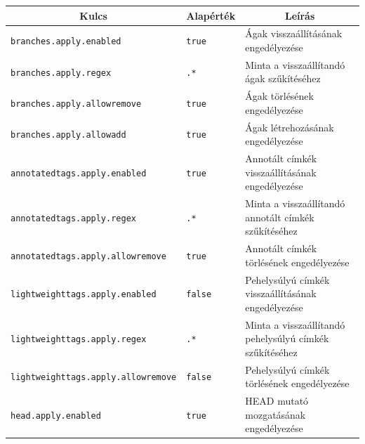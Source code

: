 \documentclass[
]{elteikthesis}[2025/03/25]
\begin{document}
\begin{table}[p]
\captionsetup{justification=justified, singlelinecheck=false}
\begin{center}
\begin{tabular}{|l|l|p{4.5cm}|} 
 \hline
 \multicolumn{1}{|c}{\textbf{Kulcs}} &
 \multicolumn{1}{|c}{\textbf{Alapérték}} &
 \multicolumn{1}{|c|}{\textbf{Leírás}} \\
 \hline\hline
 
 \texttt{branches.apply.enabled} & \texttt{true} & Ágak visszaállításának engedélyezése\vspace{0.5em} \\
 \texttt{branches.apply.regex} & \texttt{.*} & Minta a visszaállítandó ágak szűkítéséhez\vspace{0.5em} \\
 \texttt{branches.apply.allowremove} & \texttt{true} & Ágak törlésének engedélyezése\vspace{0.5em} \\
 \texttt{branches.apply.allowadd} & \texttt{true} & Ágak létrehozásának engedélyezése\vspace{0.5em} \\
 \texttt{annotatedtags.apply.enabled} & \texttt{true} & Annotált címkék visszaállításának engedélyezése\vspace{0.5em} \\
 \texttt{annotatedtags.apply.regex} & \texttt{.*} & Minta a visszaállítandó annotált címkék szűkítéséhez\vspace{0.5em} \\
 \texttt{annotatedtags.apply.allowremove} & \texttt{true} & Annotált címkék törlésének engedélyezése\vspace{0.5em} \\
 \texttt{lightweighttags.apply.enabled} & \texttt{false} & Pehelysúlyú címkék visszaállításának engedélyezése\vspace{0.5em} \\
 \texttt{lightweighttags.apply.regex} & \texttt{.*} & Minta a visszaállítandó pehelysúlyú címkék szűkítéséhez\vspace{0.5em} \\
 \texttt{lightweighttags.apply.allowremove} & \texttt{false} & Pehelysúlyú címkék törlésének engedélyezése\vspace{0.5em} \\
 \texttt{head.apply.enabled} & \texttt{true} & HEAD mutató mozgatásának engedélyezése\vspace{0.5em} \\

\end{tabular}
\end{center}
\end{table}
\end{document}
